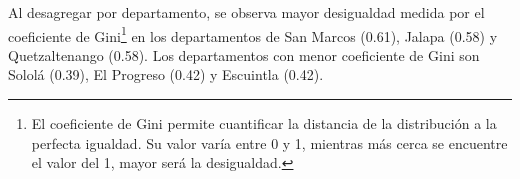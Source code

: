 Al desagregar por departamento, se observa mayor desigualdad \textemdash medida por el coeficiente de Gini\footnote{El coeficiente de Gini permite cuantificar la distancia de la distribución a la perfecta igualdad. Su valor varía entre 0 y 1, mientras más cerca se encuentre el valor del 1, mayor será la desigualdad.} \textemdash en los departamentos de San Marcos (0.61), Jalapa (0.58) y Quetzaltenango (0.58). Los departamentos con menor coeficiente de Gini son Sololá (0.39),  El Progreso  (0.42) y Escuintla (0.42).